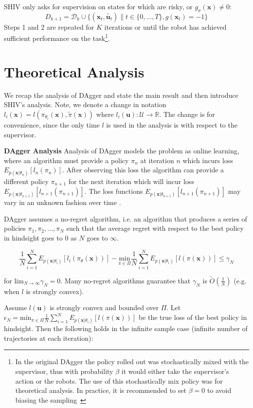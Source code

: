 \documentclass[10pt, conference]{ieeeconf}      %
\newcommand{\bu}{\mathbf{u}}
\newcommand{\bx}{\mathbf{x}}
\begin{document}
SHIV only asks for supervision on states for which are risky, or $g_{\sigma}(\bx) \neq 0$: 
$$D_{k+1}=\mathcal{D}_k \cup \{(\bx_t,\tilde{\bu_t})\|t\in\{0,\ldots,T\},g(\bx_t)=-1\}$$
Steps 1 and 2 are repeated for $K$ iterations or until 
the robot has achieved sufficient performance on the task\footnote{In the original DAgger the policy rolled out
was stochastically mixed with the supervisor, thus with probability $\beta$ it would either take the supervisor's action
or the robots. The use of this stochastically mix policy was for theoretical analysis. In practice, it is recommended
to set $\beta = 0$ to avoid biasing the sampling~\cite{NIPS2014_5421,ross2010reduction}}.

\section{Theoretical Analysis}\label{sec:theory_sec}
We recap the analysis of DAgger and state the main result and then introduce SHIV's analysis. Note, we denote a change in notation  $l_i(\bx) = l(\pi_{\theta_i}(\bx),\tilde{\pi}(\bx)) $ where $l_i(\bu): \mathcal{U} \rightarrow \mathbb{R}$. The change is for convenience, since the only time $l$ is used in the analysis is with respect to the supervisor. 

\noindent \textbf{DAgger Analysis} Analysis of DAgger models the problem as online learning, where an algorithm must provide a policy $\pi_n$ at iteration $n$ which incurs loss $E_{p(\bx|\theta_n)}[l_n(\pi_n)]$. After observing this loss the algorithm can provide a different policy $\pi_{n+1}$ for the next iteration which will incur loss $E_{p(\bx|\theta_{n+1})}[l_{n+1}(\pi_{n+1})]$. The loss functions $E_{p(\bx|\theta_{n+1})}[l_{n+1}(\pi_{n+1})]$ may vary in an unknown fashion over time \cite{ross2010reduction}.

DAgger assumes a no-regret algorithm, i.e. an algorithm that produces a series of policies $\pi_1,\pi_2,...,\pi_N$ such that the average regret with respect to the best policy in hindsight goes to $0$ as $N$ goes to $\infty$.

$$\frac{1}{N}\sum^N_{i=1} E_{p(\bx|\theta_i)} [l_i(\pi_\theta(\bx))] - \underset{\pi \in \Pi}{\mbox{min}} \frac{1}{N} \sum^N_{i=1} E_{p(\bx|\theta_i)} [l(\pi(\bx))] \leq \gamma_N$$

for $\mbox{lim}_{N \rightarrow \infty} \gamma_N = 0$. Many no-regret algorithms guarantee that $\gamma_N$ is $\tilde{O}(\frac{1}{N})$ (e.g. when $l$ is strongly convex). 

Assume $l(\bu)$ is strongly convex and bounded over $\Pi$. Let $\epsilon_N = \mbox{min}_{\pi\in \Pi} \frac{1}{N} \sum^N_{i=1} E_{p(\bx|\theta_i)} [l(\pi(\bx))]$ be the true loss of the best policy in hindsight. Then the following holds in the infinite sample case (infinite number of trajectories at each iteration):\\
\end{document}
